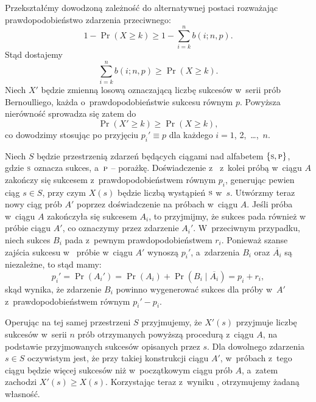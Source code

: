 \exercise{} %
Przekształćmy dowodzoną zależność do alternatywnej postaci rozważając prawdopodobieństwo zdarzenia przeciwnego:
\[
    1-\Pr(X\ge k) \ge 1-\sum_{i=k}^nb(i;n,p).
\]
Stąd dostajemy
\[
    \sum_{i=k}^nb(i;n,p) \ge \Pr(X\ge k).
\]
Niech $X'$ będzie zmienną losową oznaczającą liczbę sukcesów w~serii prób Bernoulliego, każda o~prawdopodobieństwie sukcesu równym $p$. Powyższa nierówność sprowadza się zatem do
\[
    \Pr(X'\ge k) \ge \Pr(X\ge k),
\]
co dowodzimy stosując  po przyjęciu $p_i'\equiv p$ dla każdego $i=1$, 2,~\dots,~$n$.

\exercise{} %
Niech $S$ będzie przestrzenią zdarzeń będących ciągami  nad alfabetem $\{{\scriptstyle\rm S},{\scriptstyle\rm P}\}$, gdzie ${\scriptstyle\rm S}$ oznacza sukces, a~${\scriptstyle\rm P}$ -- porażkę. Doświadczenie z~ z~kolei próbą w~ciągu $A$ zakończy się sukcesem z~prawdopodobieństwem równym $p_i$, generując pewien ciąg $s\in S$, przy czym $X(s)$ będzie liczbą wystąpień ${\scriptstyle\rm S}$ w~$s$. Utwórzmy teraz nowy ciąg prób $A'$ poprzez doświadczenie na próbach w~ciągu $A$. Jeśli  próba w~ciągu $A$ zakończyła się sukcesem $A_i$, to przyjmijmy, że sukces pada również w~ próbie ciągu $A'$, co oznaczymy przez zdarzenie $A_i'$. W~przeciwnym przypadku, niech sukces $B_i$ pada z~pewnym prawdopodobieństwem $r_i$. Ponieważ szanse zajścia sukcesu w~ próbie w~ciągu $A'$ wynoszą $p_i'$, a~zdarzenia $B_i$ oraz $\overline{A_i}$ są niezależne, to stąd mamy:
\[
    p_i' = \Pr(A_i') = \Pr(A_i)+\Pr(B_i\mid\overline{A_i}) = p_i+r_i,
\]
skąd wynika, że zdarzenie $B_i$ powinno wygenerować sukces dla  próby w~$A'$ z~prawdopodobieństwem równym $p_i'-p_i$.

Operując na tej samej przestrzeni $S$ przyjmujemy, że $X'(s)$ przyjmuje liczbę sukcesów w~serii $n$ prób otrzymanych powyższą procedurą z~ciągu $A$, na podstawie przyjmowanych sukcesów opisanych przez $s$. Dla dowolnego zdarzenia $s\in S$ oczywistym jest, że przy takiej konstrukcji ciągu $A'$, w~próbach z~tego ciągu będzie więcej sukcesów niż w~początkowym ciągu prób $A$, a~zatem zachodzi $X'(s)\ge X(s)$. Korzystając teraz z~wyniku , otrzymujemy żadaną własność.


